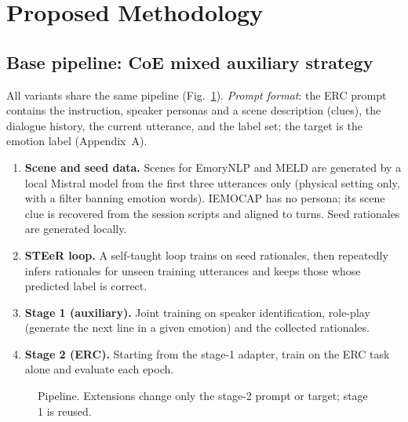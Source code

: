 \documentclass[lettersize,journal]{IEEEtran}
\begin{document}
\section{Proposed Methodology}
\subsection{Base pipeline: CoE mixed auxiliary strategy}
All variants share the same pipeline (Fig.~\ref{fig:pipeline}). \emph{Prompt format}: the ERC prompt contains the instruction, speaker personas and a scene description (clues), the dialogue history, the current utterance, and the label set; the target is the emotion label (Appendix~A).
\begin{enumerate}
\item \textbf{Scene and seed data.} Scenes for EmoryNLP and MELD are generated by a local Mistral model from the first three utterances only (physical setting only, with a filter banning emotion words). IEMOCAP has no persona; its scene clue is recovered from the session scripts and aligned to turns. Seed rationales are generated locally.
\item \textbf{STEeR loop.} A self-taught loop trains on seed rationales, then repeatedly infers rationales for unseen training utterances and keeps those whose predicted label is correct.
\item \textbf{Stage 1 (auxiliary).} Joint training on speaker identification, role-play (generate the next line in a given emotion) and the collected rationales.
\item \textbf{Stage 2 (ERC).} Starting from the stage-1 adapter, train on the ERC task alone and evaluate each epoch.
\end{enumerate}

\begin{figure}[!t]
\centering
{}
\caption{Pipeline. Extensions change only the stage-2 prompt or target; stage 1 is reused.}
\label{fig:pipeline}
\end{figure}
\end{document}
